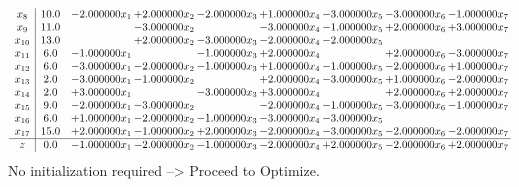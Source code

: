 \documentclass[10pt]{article}
\begin{document}
\[\begin{array}{c| c c@{\hskip 2pt} c@{\hskip 2pt} c@{\hskip 2pt} c@{\hskip 2pt} c@{\hskip 2pt} c@{\hskip 2pt} c@{\hskip 2pt} }
 x_{8}   &  10.0 & -2.000000 x_{1} & + 2.000000 x_{2} & -2.000000 x_{3} & + 1.000000 x_{4} & -3.000000 x_{5} & -3.000000 x_{6} & -1.000000 x_{7}\\
 x_{9}   &  11.0  &   & -3.000000 x_{2} &   & -3.000000 x_{4} & -1.000000 x_{5} & + 2.000000 x_{6} & + 3.000000 x_{7}\\
 x_{10}   &  13.0  &   & + 2.000000 x_{2} & -3.000000 x_{3} & -2.000000 x_{4} & -2.000000 x_{5} &    &   \\
 x_{11}   &  6.0 & -1.000000 x_{1} &   & -1.000000 x_{3} & + 2.000000 x_{4} &   & + 2.000000 x_{6} & -3.000000 x_{7}\\
 x_{12}   &  6.0 & -3.000000 x_{1} & -2.000000 x_{2} & -1.000000 x_{3} & + 1.000000 x_{4} & -1.000000 x_{5} & -2.000000 x_{6} & + 1.000000 x_{7}\\
 x_{13}   &  2.0 & -3.000000 x_{1} & -1.000000 x_{2} &   & + 2.000000 x_{4} & -3.000000 x_{5} & + 1.000000 x_{6} & -2.000000 x_{7}\\
 x_{14}   &  2.0 & + 3.000000 x_{1} &   & -3.000000 x_{3} & + 3.000000 x_{4} &   & + 2.000000 x_{6} & + 2.000000 x_{7}\\
 x_{15}   &  9.0 & -2.000000 x_{1} & -3.000000 x_{2} &   & -2.000000 x_{4} & -1.000000 x_{5} & -3.000000 x_{6} & -1.000000 x_{7}\\
 x_{16}   &  6.0 & + 1.000000 x_{1} & -2.000000 x_{2} & -1.000000 x_{3} & -3.000000 x_{4} & -3.000000 x_{5} &    &   \\
 x_{17}   &  15.0 & + 2.000000 x_{1} & -1.000000 x_{2} & + 2.000000 x_{3} & -2.000000 x_{4} & -3.000000 x_{5} & -2.000000 x_{6} & -2.000000 x_{7}\\
\hline
z    &  0.0 & -1.000000 x_{1} & -2.000000 x_{2} & -1.000000 x_{3} & -2.000000 x_{4} & + 2.000000 x_{5} & -2.000000 x_{6} & + 2.000000 x_{7}\\
\end{array}\]
No initialization required --> Proceed to Optimize. 
\end{document}
